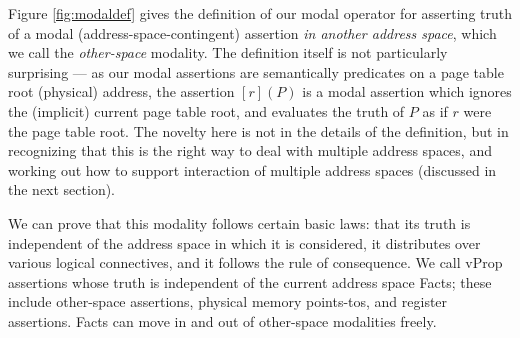 Figure \ref{fig:modaldef} gives the definition of our modal operator for asserting truth of a modal
(address-space-contingent) assertion \emph{in another address space}, which we call
the \emph{other-space} modality. The definition itself is not
particularly surprising --- as our modal assertions are semantically predicates on a page table root (physical)
address, the assertion $[r](P)$ is a modal assertion which ignores the (implicit) current page table root,
and evaluates the truth of $P$ as if $r$ were the page table root. 
The novelty here is not in the details of the definition, but in recognizing that this is the right way to deal with
multiple address spaces, and working out how to support interaction of multiple address spaces (discussed in the next section).


We can prove that this modality follows certain basic laws: that its truth is independent of the address
space in which it is considered,  it distributes over various logical connectives, and it follows the rule of
consequence.
We call \textsf{vProp} assertions whose truth is independent of the current address space
\textsf{Fact}s; these include other-space assertions, physical memory points-tos, and register assertions.
\textsf{Fact}s can move in and out of other-space modalities freely.



  

